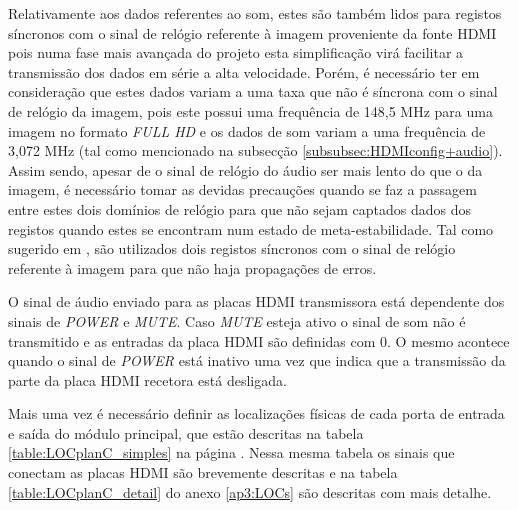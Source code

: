 Relativamente aos dados referentes ao som, estes são também lidos para registos síncronos com o sinal de relógio referente à imagem proveniente da fonte HDMI pois numa fase mais avançada do projeto esta simplificação virá facilitar a transmissão dos dados em série a alta velocidade. Porém, é necessário ter em consideração que estes dados variam a uma taxa que não é síncrona com o sinal de relógio da imagem, pois este possui uma frequência de 148,5 MHz para uma imagem no formato \textit{FULL HD} e os dados de som variam a uma frequência de 3,072 MHz (tal como mencionado na subsecção \ref{subsubsec:HDMIconfig+audio}). Assim sendo, apesar de o sinal de relógio do áudio ser mais lento do que o da imagem, é necessário tomar as devidas precauções quando se faz a passagem entre estes dois domínios de relógio para que não sejam captados dados dos registos quando estes se encontram num estado de meta-estabilidade. Tal como sugerido em \cite{R024}, são utilizados dois registos síncronos com o sinal de relógio referente à imagem para que não haja propagações de erros.

O sinal de áudio enviado para as placas HDMI transmissora está dependente dos sinais de \textit{POWER} e \textit{MUTE}. Caso \textit{MUTE} esteja ativo o sinal de som não é transmitido e as entradas da placa HDMI são definidas com 0. O mesmo acontece quando o sinal de \textit{POWER} está inativo uma vez que indica que a transmissão da parte da placa HDMI recetora está desligada.

Mais uma vez é necessário definir as localizações físicas de cada porta de entrada e saída do módulo principal, que estão descritas na tabela \ref{table:LOCplanC_simples} na página \pageref{table:LOCplanC_simples}. Nessa mesma tabela os sinais que conectam as placas HDMI são brevemente descritas e  na tabela \ref{table:LOCplanC_detail} do anexo \ref{ap3:LOCs} são descritas com mais detalhe.

